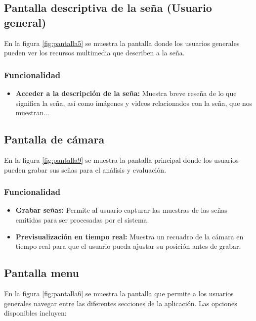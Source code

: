 \subsection{Pantalla descriptiva de la seña  (Usuario general)}


En la figura \ref{fig:pantalla5} se muestra la pantalla donde los usuarios generales pueden ver los recursos multimedia que describen a la seña.

\subsubsection{Funcionalidad}
\begin{itemize}
    \item \textbf{Acceder a la descripción de la seña:} Muestra breve reseña de lo que significa la seña, así como imágenes y videos relacionados con la seña, que nos muestran...
\end{itemize}
\subsection{Pantalla de cámara}


En la figura \ref{fig:pantalla9} se muestra la pantalla principal donde los usuarios pueden grabar sus señas para el análisis y evaluación.

\subsubsection{Funcionalidad}
\begin{itemize}
    \item \textbf{Grabar señas:} Permite al usuario capturar las muestras de las señas emitidas para ser procesadas por el sistema.
    \item \textbf{Previsualización en tiempo real:} Muestra un recuadro de la cámara en tiempo real para que el usuario pueda ajustar su posición antes de grabar.
\end{itemize}
\subsection{Pantalla menu}

En la figura \ref{fig:pantalla6} se muestra la pantalla que permite a los usuarios generales navegar entre las diferentes secciones de la aplicación. Las opciones disponibles incluyen:

